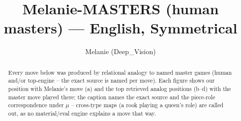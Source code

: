 \documentclass[11pt]{article}
\title{Melanie-MASTERS (human masters) — English, Symmetrical}
\author{Melanie (Deep\_Vision)}
\date{}
\begin{document}
\maketitle

\begin{abstract}Every move below was produced by relational analogy to named master games (human and/or top-engine -- the exact source is named per move). Each figure shows our position with Melanie's move (a) and the top retrieved analog positions (b--d) with the master move played there; the caption names the exact source and the piece-role correspondence under $\mu$ -- cross-type maps (a rook playing a queen's role) are called out, as no material/eval engine explains a move that way.\end{abstract}

\begin{figure}[p]\centering
\begin{subfigure}{0.46\textwidth}\centering
\resizebox{\linewidth}{!}{%
\newchessgame
\chessboard[
  setfen={r1bq1rk1/pp1pppbp/2n2np1/2p5/2P5/P1N2NP1/1P1PPPBP/R1BQ1RK1 b - - 0 7},
  showmover=false,
  pgfstyle=straightmove, color=movearrow, markmove={f6-h5}
]}
\caption{}
\end{subfigure}\hfill
\begin{subfigure}{0.46\textwidth}\centering
\resizebox{\linewidth}{!}{%
\newchessgame
\chessboard[
  setfen={r1bq1rk1/2p1bppp/1p2pn2/n2p4/3P1B2/2N2NP1/PP2PPBP/R2Q1RK1 w - - 2 11},
  showmover=false,
  pgfstyle=straightmove, color=movearrow, markmove={f3-e5}
]}
\caption{}
\end{subfigure}
\\[4pt]
\begin{subfigure}{0.46\textwidth}\centering
\resizebox{\linewidth}{!}{%
\newchessgame
\chessboard[
  setfen={r1bq1rk1/1pp1bppp/4pn2/nN1p4/P2P4/5NP1/1BP1PPBP/R2Q1RK1 w - - 3 12},
  showmover=false,
  pgfstyle=straightmove, color=movearrow, markmove={f3-d2}
]}
\caption{}
\end{subfigure}\hfill
\begin{subfigure}{0.46\textwidth}\centering
\resizebox{\linewidth}{!}{%
\newchessgame
\chessboard[
  setfen={rnbq1rk1/1p2ppbp/p2p1np1/3P4/8/2N2NPP/PP2PPB1/R1BQ1RK1 w - - 0 11},
  showmover=false,
  pgfstyle=straightmove, color=movearrow, markmove={f3-d4}
]}
\caption{}
\end{subfigure}

\end{figure}
\end{document}
